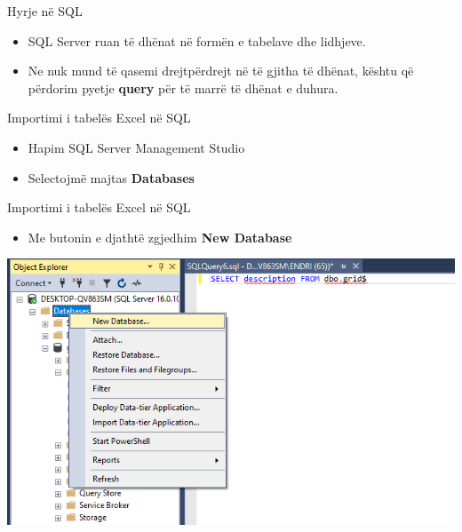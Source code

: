 \documentclass[
  ignorenonframetext,
]{beamer}
\providecommand{\tightlist}{%
  \setlength{\itemsep}{0pt}\setlength{\parskip}{0pt}}
\begin{document}
\begin{frame}{Hyrje në SQL}
\label{hyrje-nuxeb-sql-2}
\begin{itemize}
\item
  SQL Server ruan të dhënat në formën e tabelave dhe lidhjeve.
\item
  Ne nuk mund të qasemi drejtpërdrejt në të gjitha të dhënat, kështu që
  përdorim pyetje \textbf{query} për të marrë të dhënat e duhura.
\end{itemize}
\end{frame}

\begin{frame}{Importimi i tabelës Excel në SQL}
\label{importimi-i-tabeluxebs-excel-nuxeb-sql}
\begin{itemize}
\item
  Hapim SQL Server Management Studio
\item
  Selectojmë majtas \textbf{Databases}
\end{itemize}
\end{frame}

\begin{frame}{Importimi i tabelës Excel në SQL}
\label{importimi-i-tabeluxebs-excel-nuxeb-sql-1}
\begin{itemize}
\tightlist
\item
  Me butonin e djathtë zgjedhim \textbf{New Database}
\end{itemize}

\includegraphics{./Figs/db1.png}
\end{frame}
\end{document}
